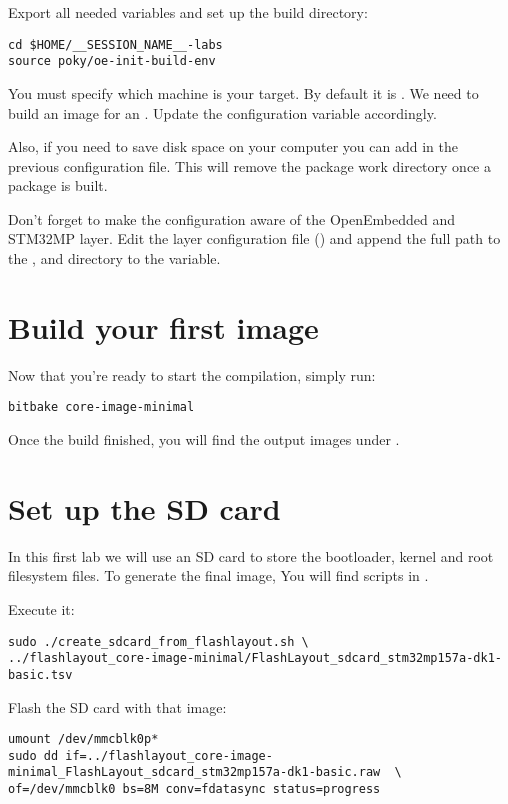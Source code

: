 Export all needed variables and set up the build directory:
\begin{verbatim}
cd $HOME/__SESSION_NAME__-labs
source poky/oe-init-build-env
\end{verbatim}

You must specify which machine is your target. By default it
is . We need to build an image for an .
Update the  configuration variable accordingly.

Also, if you need to save disk space on your computer you can add  in the previous configuration file. This will remove the
package work directory once a package is built.

Don't forget to make the configuration aware of the OpenEmbedded and
STM32MP layer. Edit the layer configuration file
() and append the full path to the
,  and  directory to the
 variable.

\section{Build your first image}

Now that you're ready to start the compilation, simply run:
\begin{verbatim}
bitbake core-image-minimal
\end{verbatim}

Once the build finished, you will find the output images under
.

\section{Set up the SD card}

In this first lab we will use an SD card to store the bootloader, kernel and
root filesystem files. To generate the final image, You will find scripts in
.

Execute it:
\begin{verbatim}
sudo ./create_sdcard_from_flashlayout.sh \
../flashlayout_core-image-minimal/FlashLayout_sdcard_stm32mp157a-dk1-basic.tsv
\end{verbatim}

Flash the SD card with that image:
\begin{verbatim}
umount /dev/mmcblk0p*
sudo dd if=../flashlayout_core-image-minimal_FlashLayout_sdcard_stm32mp157a-dk1-basic.raw  \
of=/dev/mmcblk0 bs=8M conv=fdatasync status=progress
\end{verbatim}

